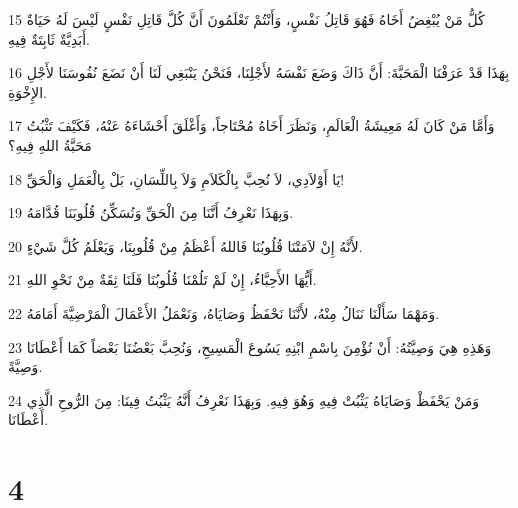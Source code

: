 \par 15 كُلُّ مَنْ يُبْغِضُ أَخَاهُ فَهُوَ قَاتِلُ نَفْسٍ، وَأَنْتُمْ تَعْلَمُونَ أَنَّ كُلَّ قَاتِلِ نَفْسٍ لَيْسَ لَهُ حَيَاةٌ أَبَدِيَّةٌ ثَابِتَةٌ فِيهِ.
\par 16 بِهَذَا قَدْ عَرَفْنَا الْمَحَبَّةَ: أَنَّ ذَاكَ وَضَعَ نَفْسَهُ لأَجْلِنَا، فَنَحْنُ يَنْبَغِي لَنَا أَنْ نَضَعَ نُفُوسَنَا لأَجْلِ الإِخْوَةِ.
\par 17 وَأَمَّا مَنْ كَانَ لَهُ مَعِيشَةُ الْعَالَمِ، وَنَظَرَ أَخَاهُ مُحْتَاجاً، وَأَغْلَقَ أَحْشَاءَهُ عَنْهُ، فَكَيْفَ تَثْبُتُ مَحَبَّةُ اللهِ فِيهِ؟
\par 18 يَا أَوْلاَدِي، لاَ نُحِبَّ بِالْكَلاَمِ وَلاَ بِاللِّسَانِ، بَلْ بِالْعَمَلِ وَالْحَقِّ!
\par 19 وَبِهَذَا نَعْرِفُ أَنَّنَا مِنَ الْحَقِّ وَنُسَكِّنُ قُلُوبَنَا قُدَّامَهُ.
\par 20 لأَنَّهُ إِنْ لاَمَتْنَا قُلُوبُنَا فَاللهُ أَعْظَمُ مِنْ قُلُوبِنَا، وَيَعْلَمُ كُلَّ شَيْءٍ.
\par 21 أَيُّهَا الأَحِبَّاءُ، إِنْ لَمْ تَلُمْنَا قُلُوبُنَا فَلَنَا ثِقَةٌ مِنْ نَحْوِ اللهِ.
\par 22 وَمَهْمَا سَأَلْنَا نَنَالُ مِنْهُ، لأَنَّنَا نَحْفَظُ وَصَايَاهُ، وَنَعْمَلُ الأَعْمَالَ الْمَرْضِيَّةَ أَمَامَهُ.
\par 23 وَهَذِهِ هِيَ وَصِيَّتُهُ: أَنْ نُؤْمِنَ بِاسْمِ ابْنِهِ يَسُوعَ الْمَسِيحِ، وَنُحِبَّ بَعْضُنَا بَعْضاً كَمَا أَعْطَانَا وَصِيَّةً.
\par 24 وَمَنْ يَحْفَظْ وَصَايَاهُ يَثْبُتْ فِيهِ وَهُوَ فِيهِ. وَبِهَذَا نَعْرِفُ أَنَّهُ يَثْبُتُ فِينَا: مِنَ الرُّوحِ الَّذِي أَعْطَانَا.

\chapter{4}

